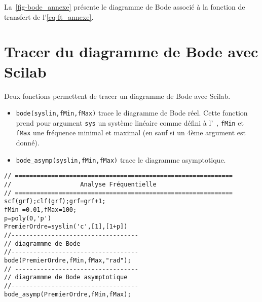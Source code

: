 La~\cref{fig-bode_annexe} présente le diagramme de Bode associé à 
la fonction de transfert de l'\cref{eq-ft_annexe}.

\section{Tracer du diagramme de Bode avec Scilab}
Deux fonctions permettent de tracer un diagramme de Bode avec Scilab.
\begin{itemize}
        \item  \verb?bode(syslin,fMin,fMax)? trace le diagramme de Bode réel. Cette fonction 
            prend pour argument \verb?sys? un 
            système linéaire comme défini à l'~, 
            \verb?fMin? et \verb?fMax? une fréquence minimal et maximal (en \unit{}{\hertz} 
            sauf si un 4ème argument est donné). 
        \item  \verb?bode_asymp(syslin,fMin,fMax)? trace le diagramme asymptotique.
\end{itemize}


\begin{code}
\begin{verbatim}
// ============================================================
//                   Analyse Fréquentielle                                                                      
// ============================================================
scf(grf);clf(grf);grf=grf+1;
fMin =0.01,fMax=100;
p=poly(0,'p')
PremierOrdre=syslin('c',[1],[1+p])
//-----------------------------------
// diagrammme de Bode
//-----------------------------------
bode(PremierOrdre,fMin,fMax,"rad");
// ----------------------------------
// diagrammme de Bode asymptotique
//-----------------------------------
bode_asymp(PremierOrdre,fMin,fMax);
\end{verbatim}
\end{code}


